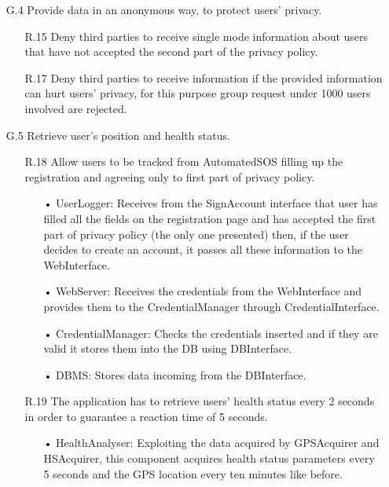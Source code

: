 \begin{enumerate}
\item [G.4] Provide data in an anonymous way, to protect users' privacy.
	\begin{enumerate}
    \item [R.15] Deny third parties to receive single mode information about users that have not accepted the second part of the privacy policy.
    \item [R.17] Deny third parties to receive information if the provided information can hurt users' privacy, for this purpose group request under 1000 users involved are rejected.
    \end{enumerate}	


\item [G.5] Retrieve user's position and health status.
	\begin{enumerate}
	\item [R.18] Allow users to be tracked from AutomatedSOS filling up the registration and agreeing only to first part of privacy policy.
		\begin{enumerate}
		\item[•] UserLogger: Receives from the SignAccount interface that user has filled all the fields on the registration page and has accepted the first part of privacy policy (the only one presented) then, if the user decides to create an account, it passes all these information to the WebInterface.
		\item[•] WebServer: Receives the credentials from the WebInterface and provides them to the CredentialManager through CredentialInterface.
		\item[•] CredentialManager: Checks the credentials inserted and if they are valid it stores them into the DB using DBInterface.
		\item[•] DBMS: Stores data incoming from the DBInterface.
		\end{enumerate}
		
	\item [R.19] The application has to retrieve users' health status every 2 seconds in order to guarantee a reaction time of 5 seconds.
		\begin{enumerate}
		\item[•] HealthAnalyser: Exploiting the data acquired by GPSAcquirer and HSAcquirer, this component acquires health status parameters every 5 seconds and the GPS location every ten minutes like before.
		\end{enumerate}	
	\end{enumerate}	
	

\end{enumerate}
